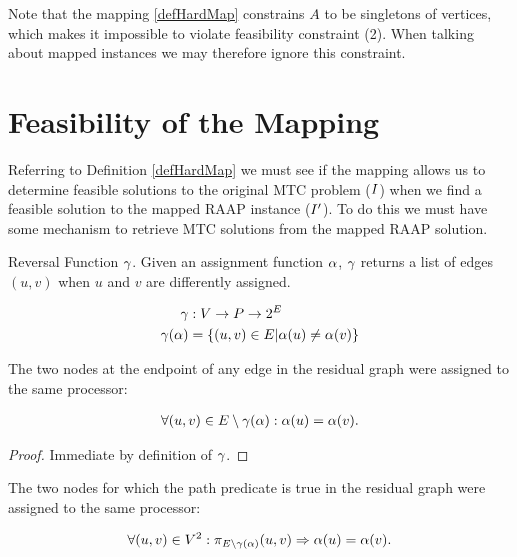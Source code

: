 Note that the mapping \ref{defHardMap} constrains $A$ to be singletons of vertices, which makes it impossible to violate feasibility constraint (2).
When talking about mapped instances we may therefore ignore this constraint.

\section{Feasibility of the Mapping}
\label{secHardFeas}

Referring to Definition \ref{defHardMap} we must see if the mapping allows us to determine feasible solutions to the original MTC problem ($I$) when we find a feasible solution to the mapped RAAP instance ($I'$).
To do this we must have some mechanism to retrieve MTC solutions from the mapped RAAP solution.

\begin{definition}
Reversal Function $\gamma$.
Given an assignment function $\alpha$, $\gamma$ returns a list of edges $(u, v)$ when $u$ and $v$ are differently assigned.

\begin{align}
	\nonumber \gamma & : V \rightarrow P \rightarrow 2^E \\
	\nonumber \gamma(\alpha) & = \{(u,v) \in E | \alpha(u) \neq \alpha(v)\}
\end{align}
\end{definition}

\begin{lemma}
\label{EDGEASSIGN}
The two nodes at the endpoint of any edge in the residual graph were assigned to the same processor:

\begin{align}
	\nonumber \forall(u, v) \in E \setminus \gamma(\alpha) : \alpha(u) = \alpha(v).
\end{align}
\end{lemma}

\begin{proof}
Immediate by definition of $\gamma$.
\end{proof}

\begin{lemma}
\label{PATHASSIGN}
The two nodes for which the path predicate is true in the residual graph were assigned to the same processor:

\begin{align}
	\nonumber \forall (u, v) \in V^2 : \pi_{E \setminus \gamma(\alpha)}(u, v) \Rightarrow \alpha(u) = \alpha(v).
\end{align}
\end{lemma}

